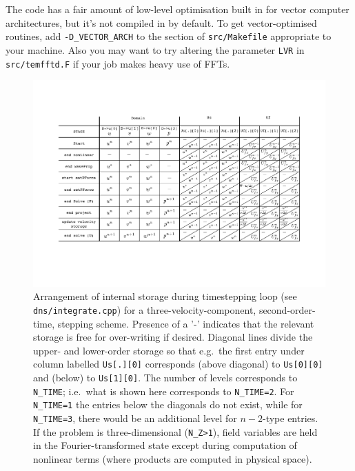 \documentclass[11pt]{report}
\newcommand{\eg}{e.g.\ } \newcommand{\CC}{\mathrm{c.c.}}
\begin{document}
The code has a fair amount of low-level optimisation built in for
vector computer architectures, but it's not compiled in by default. To
get vector-optimised routines, add \verb+-D_VECTOR_ARCH+ to the
section of \texttt{src/Makefile} appropriate to your machine. Also you
may want to try altering the parameter \texttt{LVR} in
\texttt{src/temfftd.F} if your job makes heavy use of FFTs.

\begin{figure}
\begin{center}
\includegraphics[width=\textwidth]
{timeSchemeStorage}
\end{center}
\caption{Arrangement of internal storage during timestepping loop (see
  \texttt{dns/integrate.cpp}) for a three-velocity-component,
  second-order-time, stepping scheme. Presence of a '-' indicates that
  the relevant storage is free for over-writing if desired.  Diagonal
  lines divide the upper- and lower-order storage so that \eg the
  first entry under column labelled \texttt{Us[.][0]} corresponds
  (above diagonal) to \texttt{Us[0][0]} and (below) to
  \texttt{Us[1][0]}.
%
  The number of levels corresponds to
  \texttt{N\_TIME}; i.e.\ what is shown here corresponds to
  \texttt{N\_TIME=2}.  For \texttt{N\_TIME=1} the entries below the
  diagonals do not exist, while for \texttt{N\_TIME=3}, there would be
  an additional level for $n-2$-type entries.
%
  If the problem is three-dimensional (\texttt{N\_Z>1}), field
  variables are held in the Fourier-transformed state except during
  computation of nonlinear terms (where products are computed in
  physical space). }
\label{fig.storage}
\end{figure}
\end{document}
